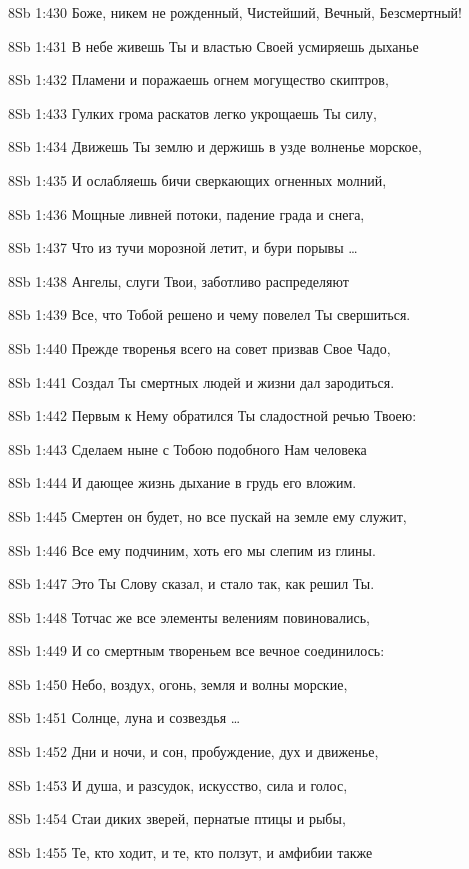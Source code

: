\vs 8Sb 1:430 Боже, никем не рожденный, Чистейший, Вечный, Безсмертный!

\vs 8Sb 1:431 В небе живешь Ты и властью Своей усмиряешь дыханье 

\vs 8Sb 1:432 Пламени и поражаешь огнем могущество скиптров, 

\vs 8Sb 1:433 Гулких грома раскатов легко укрощаешь Ты силу, 

\vs 8Sb 1:434 Движешь Ты землю и держишь в узде волненье морское, 

\vs 8Sb 1:435 И ослабляешь бичи сверкающих огненных молний,

\vs 8Sb 1:436 Мощные ливней потоки, падение града и снега, 

\vs 8Sb 1:437 Что из тучи морозной летит, и бури порывы \ldots

\vs 8Sb 1:438 Ангелы, слуги Твои, заботливо распределяют

\vs 8Sb 1:439 Все, что Тобой решено и чему повелел Ты свершиться.

\vs 8Sb 1:440 Прежде творенья всего на совет призвав Свое Чадо, 

\vs 8Sb 1:441 Создал Ты смертных людей и жизни дал зародиться.

\vs 8Sb 1:442 Первым к Нему обратился Ты сладостной речью Твоею: 

\vs 8Sb 1:443 Сделаем ныне с Тобою подобного Нам человека 

\vs 8Sb 1:444 И дающее жизнь дыхание в грудь его вложим. 

\vs 8Sb 1:445 Смертен он будет, но все пускай на земле ему служит,

\vs 8Sb 1:446 Все ему подчиним, хоть его мы слепим из глины. 

\vs 8Sb 1:447 Это Ты Слову сказал, и стало так, как решил Ты. 

\vs 8Sb 1:448 Тотчас же все элементы велениям повиновались, 

\vs 8Sb 1:449 И со смертным твореньем все вечное соединилось: 

\vs 8Sb 1:450 Небо, воздух, огонь, земля и волны морские,

\vs 8Sb 1:451 Солнце, луна и созвездья \ldots

\vs 8Sb 1:452 Дни и ночи, и сон, пробуждение, дух и движенье, 

\vs 8Sb 1:453 И душа, и разсудок, искусство, сила и голос, 

\vs 8Sb 1:454 Стаи диких зверей, пернатые птицы и рыбы, 

\vs 8Sb 1:455 Те, кто ходит, и те, кто ползут, и амфибии также 

